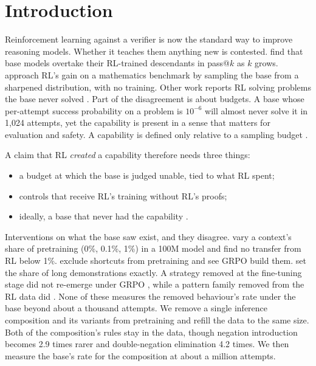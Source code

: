 \section{Introduction}
\label{sec:intro}

Reinforcement learning against a verifier is now the standard way to improve reasoning models. Whether it teaches them
anything new is contested. \citet{yue2025doesrl} find that base models overtake their RL-trained descendants in
pass@$k$ as $k$ grows. \citet{karan2025power} approach RL's gain on a mathematics benchmark by sampling the base from a
sharpened distribution, with no training. Other work reports RL solving problems the base never solved
\citep{abdulsalam2026rewrite,liu2025prorl}. Part of the disagreement is about budgets. A base whose per-attempt success
probability on a problem is $10^{-6}$ will almost never solve it in 1,024 attempts, yet the capability is present in a
sense that matters for evaluation and safety. A capability is defined only relative to a sampling budget
\citep{li2026elicitcreate,brown2024monkeys}.

A claim that RL \emph{created} a capability therefore needs three things:
\begin{itemize}
\item a budget at which the base is judged unable, tied to what RL spent;
\item controls that receive RL's training without RL's proofs;
\item ideally, a base that never had the capability \citep{jain2023mechanistically,deeb2024unlearning}.
\end{itemize}
Interventions on what the base saw exist, and they disagree. \citet{zhang2025interplay} vary a context's share of
pretraining (0\%, 0.1\%, 1\%) in a 100M model and find no transfer from RL below 1\%. \citet{abdulsalam2026rewrite}
exclude shortcuts from pretraining and see GRPO build them. \citet{tsilivis2025rlntp} set the share of long
demonstrations exactly. A strategy removed at the fine-tuning stage did not re-emerge under GRPO
\citep{krishnamurthy2026select}, while a pattern family removed from the RL data did \citep{park2025countdown}. None of
these measures the removed behaviour's rate under the base beyond about a thousand attempts. We remove a single inference composition and its variants from pretraining
and refill the data to the same size. Both of the composition's rules stay in the data, though negation introduction becomes 2.9 times
rarer and double-negation elimination 4.2 times. We then measure the base's rate for the composition at about a million attempts.

